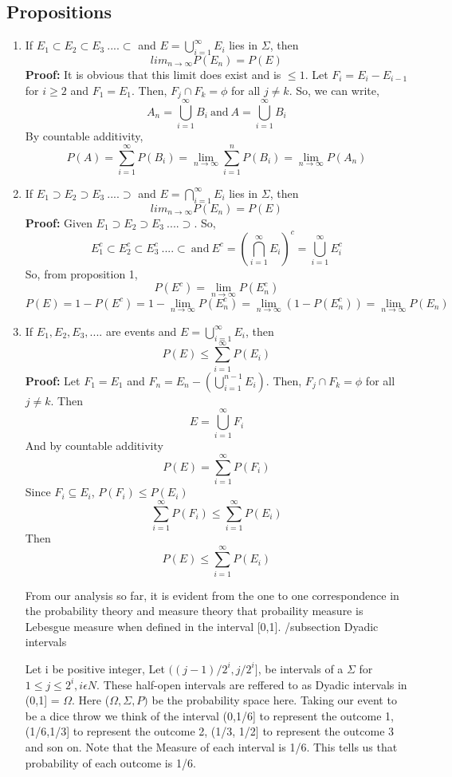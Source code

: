 \documentclass{article}
\begin{document}
\subsection{Propositions}
\begin{enumerate}
	\item If $E_1 \subset E_2 \subset E_3 \ ....\subset$ and $E = \bigcup \limits_{i=1}^\infty E_i$ lies in $\Sigma$, then 
	$$lim_{n \rightarrow \infty}P(E_n) = P(E)$$
	\textbf{Proof: }It is obvious that this limit does exist and is $\leq 1$. Let $F_i = E_i - E_{i-1}$ for $i \geq 2$ and $F_1 = E_1$. Then, $F_j \cap F_k = \phi$ for all $j \neq k$. So, we can write,
	$$A_n = \bigcup \limits_{i=1}^\infty B_i \ \textrm{and}\  A = \bigcup \limits_{i=1}^\infty B_i$$
	By countable additivity,
	$$P(A) = \sum \limits_{i=1}^\infty P(B_i) = \lim_{n \rightarrow \infty } \sum \limits_{i=1}^n P(B_i) = \lim_{n \rightarrow \infty}P(A_n) $$
	\item If $E_1 \supset E_2 \supset E_3 \ ....\supset$ and $E = \bigcap \limits_{i=1}^\infty E_i$ lies in $\Sigma$, then 
	$$lim_{n \rightarrow \infty}P(E_n) = P(E)$$
	\textbf{Proof: } Given $E_1 \supset E_2 \supset E_3 \ ....\supset$. So, $$E_1^c \subset E_2^c \subset E_3^c \ ....\subset \ \textrm{and}\  E^c =  (\bigcap \limits_{i=1}^\infty E_i)^c = \bigcup \limits_{i=1}^\infty E_i^c$$
	So, from proposition 1,
	$$P(E^c) = \lim_{n \rightarrow \infty}P(E_n^c)$$
	$$P(E) = 1 - P(E^c) = 1 - \lim_{n \rightarrow \infty}P(E_n^c) = \lim_{n \rightarrow \infty}(1- P(E_n^c)) = \lim_{n \rightarrow \infty}P(E_n)$$
	\item If $E_1, E_2, E_3,....$ are events and $E = \bigcup \limits_{i=1}^\infty E_i$, then 
	$$P(E) \leq \sum \limits_{i=1}^\infty P(E_i)$$
	\textbf{Proof: }Let $F_1 = E_1$ and $F_n = E_n - (\bigcup \limits_{i=1}^{n-1}E_i)$. Then, $F_j \cap F_k = \phi $ for all $j \neq k$. Then
	$$E = \bigcup \limits_{i=1}^\infty F_i$$
	And by countable additivity
	$$P(E) = \sum \limits_{i=1}^\infty P(F_i)$$
	Since $F_i \subseteq E_i$, $P(F_i) \leq P(E_i)$
	$$\sum \limits_{i=1}^\infty P(F_i) \leq \sum \limits_{i=1}^\infty P(E_i)$$
	Then
	$$P(E) \leq \sum \limits_{i=1}^\infty P(E_i)$$
	
From our analysis so far, it is evident from the one to one correspondence in the probability theory and measure theory that probaility measure is Lebesgue measure when defined in the interval [0,1].	
/subsection {Dyadic intervals}

Let i be positive integer, Let $((j-1)/2^{i} , j/2^{i}]$, be intervals of a $\Sigma$ for $1 \le j \le 2^{i}, i \epsilon N$. These half-open intervals are reffered to as Dyadic intervals in (0,1] = $\Omega$. 
Here ($\Omega, \Sigma, P)$ be the probability space here. Taking our event to be a dice throw we think of the interval (0,1/6] to represent the outcome 1, (1/6,1/3] to represent the outcome 2, (1/3, 1/2] to represent the outcome 3 and son on. Note that the Measure of each interval is 1/6. This tells us that probability of each outcome is 1/6.


\end{enumerate}
\end{document}
